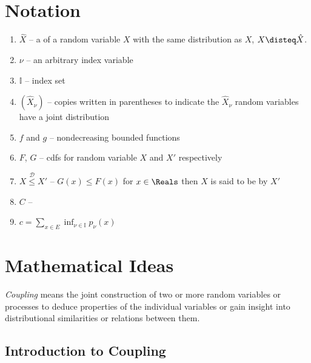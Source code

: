 \documentclass[12pt]{article}
\begin{document}
\section*{Notation}
\begin{enumerate}
    \item
        \( \hat{X} \) -- a  of a random variable \( X \) with
        the same distribution as \( X \), \( X \disteq \hat{X} \).
    \item
        \( \nu \) -- an arbitrary index variable
    \item
        \( \mathbb{I} \) -- index set
    \item
        \( (\hat{X}_\nu) \) -- copies written in parentheses to indicate
        the \( \hat{X}_\nu \) random variables have a joint distribution
    \item
        \( f \) and \( g \) -- nondecreasing bounded functions
    \item
        \( F \), \( G \) -- cdfs for random variable \( X \) and \( X' \)
        respectively
    \item
        \( X \stackrel{\mathcal{D}}{\le} X' \) -- \( G(x) \le F(x) \)
        for \( x \in \Reals \) then \( X \) is said to be  by \( X' \)
    \item
        \( C \) -- 
    \item
        \( c = \sum\limits_{x \in E} \inf_{\nu \in \mathbb{I}} p_\nu(x) \)
\end{enumerate}

\section*{Mathematical Ideas}

\emph{Coupling} means the joint construction of two or more random
variables or processes to deduce properties of the individual variables
or gain insight into distributional similarities or relations between
them.

\subsection*{Introduction to Coupling}
\end{document}
